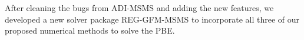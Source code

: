 After cleaning the bugs from ADI-MSMS and adding the new features, we developed a new solver package REG-GFM-MSMS to incorporate all three of our proposed numerical methods to solve the PBE. 


